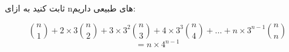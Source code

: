 \p    
ثابت کنید به ازای n‌های طبیعی داریم:

\[
\binom{n}{1} + 2\times3\binom{n}{2} + 3\times3^2\binom{n}{3} + 4\times3^3\binom{n}{4} +\ldots +
n\times3^{n-1}\binom{n}{n}
\]
\[
    = n\times4^{n-1}  
\]